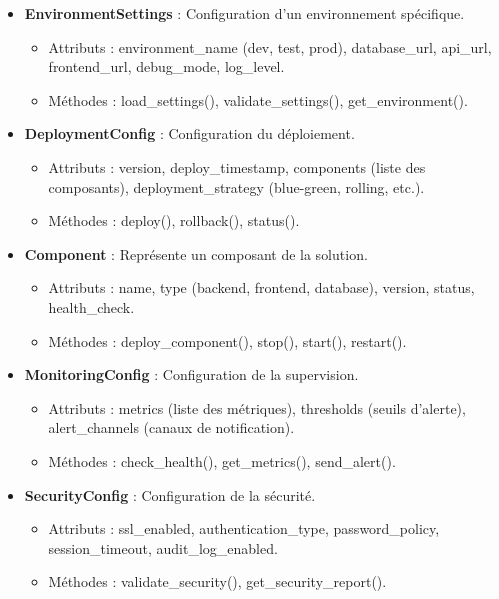 \begin{itemize}
    \item \textbf{EnvironmentSettings} : Configuration d'un environnement spécifique.
        \begin{itemize}
            \item Attributs : environment\_name (dev, test, prod), database\_url, api\_url, frontend\_url, debug\_mode, log\_level.
            \item Méthodes : load\_settings(), validate\_settings(), get\_environment().
        \end{itemize}
    
    \item \textbf{DeploymentConfig} : Configuration du déploiement.
        \begin{itemize}
            \item Attributs : version, deploy\_timestamp, components (liste des composants), deployment\_strategy (blue-green, rolling, etc.).
            \item Méthodes : deploy(), rollback(), status().
        \end{itemize}
    
    \item \textbf{Component} : Représente un composant de la solution.
        \begin{itemize}
            \item Attributs : name, type (backend, frontend, database), version, status, health\_check.
            \item Méthodes : deploy\_component(), stop(), start(), restart().
        \end{itemize}
    
    \item \textbf{MonitoringConfig} : Configuration de la supervision.
        \begin{itemize}
            \item Attributs : metrics (liste des métriques), thresholds (seuils d'alerte), alert\_channels (canaux de notification).
            \item Méthodes : check\_health(), get\_metrics(), send\_alert().
        \end{itemize}
    
    \item \textbf{SecurityConfig} : Configuration de la sécurité.
        \begin{itemize}
            \item Attributs : ssl\_enabled, authentication\_type, password\_policy, session\_timeout, audit\_log\_enabled.
            \item Méthodes : validate\_security(), get\_security\_report().
        \end{itemize}
\end{itemize}

